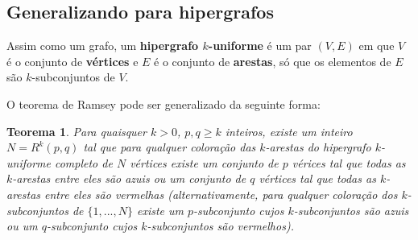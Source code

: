 \documentclass[a4paper]{book}
\newtheorem{teorema}{Teorema}
\begin{document}
\subsection {Generalizando para hipergrafos}
Assim como um grafo, um \textbf{hipergrafo $k$-uniforme} é um par $(V,E)$ em que $V$ é o conjunto de \textbf{vértices} e $E$ é o conjunto de \textbf{arestas}, só que os elementos de $E$ são $k$-subconjuntos de $V$.

O teorema de Ramsey pode ser generalizado da seguinte forma:

\begin{teorema}
    Para quaisquer $k>0$, $p,q\geq k$ inteiros, existe um inteiro $N=R^k(p,q)$ tal que para qualquer coloração das $k$-arestas do hipergrafo $k$-uniforme completo de $N$ vértices existe um conjunto de $p$ vérices tal que todas as $k$-arestas entre eles são azuis ou um conjunto de $q$ vértices tal que todas as $k$-arestas entre eles são vermelhas (alternativamente, para qualquer coloração dos $k$-subconjuntos de $\{1,...,N\}$ existe um $p$-subconjunto cujos $k$-subconjuntos são azuis ou um $q$-subconjunto cujos $k$-subconjuntos são vermelhos).
\end{teorema}
\end{document}
